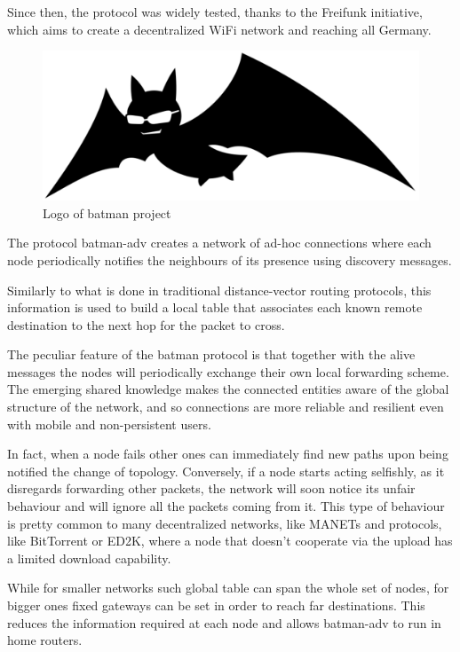 \documentclass[conference]{IEEEtran}
\begin{document}
Since then, the protocol was widely tested, thanks to the Freifunk initiative, which aims to create a decentralized WiFi network and reaching all Germany.

\begin{figure}[h]
  \centering
  \includegraphics[width=0.8\linewidth]{figures/logo.pdf}
  \caption{Logo of \gls{batman} project}
  \label{fig:batman_logo}
\end{figure}

\smallskip


The protocol \gls{batman}-adv creates a network of ad-hoc connections where each node periodically notifies the neighbours of its presence using discovery messages.

Similarly to what is done in traditional distance-vector routing protocols, this information is used to build a local table that associates each known remote destination to the next hop for the packet to cross.

The peculiar feature of the \gls{batman} protocol is that together with the alive messages the nodes will periodically exchange their own local forwarding scheme. The emerging shared knowledge makes the connected entities aware of the global structure of the network, and so connections are more reliable and resilient even with mobile and non-persistent users.

In fact, when a node fails other ones can immediately find new paths upon being notified the change of topology.
Conversely, if a node starts acting selfishly, as it disregards forwarding other packets, the network will soon notice its unfair behaviour and will ignore all the packets coming from it.
This type of behaviour is pretty common to many decentralized networks, like MANETs \cite{MANETs} and protocols, like BitTorrent or ED2K, where a node that doesn't cooperate via the upload has a limited download capability.\cite{BitTorrent,ed2k}

While for smaller networks such global table can span the whole set of nodes, for bigger ones fixed gateways can be set in order to reach far destinations. This reduces the information required at each node and allows \gls{batman}-adv to run in home routers.
\end{document}
